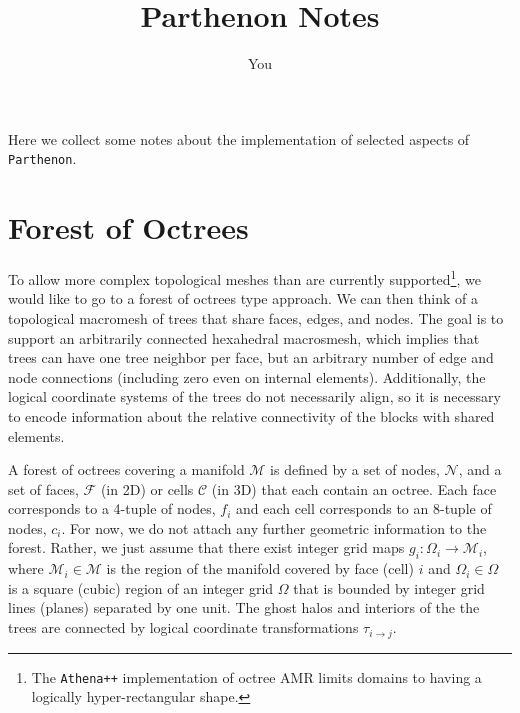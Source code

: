 \documentclass{article}
\title{Parthenon Notes}
\author{You}
\begin{document}
\maketitle

Here we collect some notes about the implementation of selected aspects of \texttt{Parthenon}.
\tableofcontents 

\section{Forest of Octrees} 

To allow more complex topological meshes than are currently supported\footnote{The \texttt{Athena++} implementation  of octree AMR limits domains to having a logically hyper-rectangular shape.}, we would like to go to a forest of octrees type approach. We can then think of a topological macromesh of trees that share faces, edges, and nodes. The goal is to support an arbitrarily connected hexahedral macrosmesh, which implies that trees can have one tree neighbor per face, but an arbitrary number of edge and node connections (including zero even on internal elements). Additionally, the logical coordinate systems of the trees do not necessarily align, so it is necessary to encode information about the relative connectivity of the blocks with shared elements. 

A forest of octrees covering a manifold $\mathcal{M}$ is defined by a set of nodes, $\mathcal{N}$, and a set of faces, $\mathcal{F}$ (in 2D) or cells $\mathcal{C}$ (in 3D) that each contain an octree. Each face corresponds to a 4-tuple of nodes, $f_i$ and each cell corresponds to an 8-tuple of nodes, $c_i$. For now, we do not attach any further geometric information to the forest. Rather, we just assume that there exist integer grid maps $g_i: \Omega_i \rightarrow \mathcal{M}_i$, where $\mathcal{M}_i \in \mathcal{M}$ is the region of the manifold covered by face (cell) $i$ and $\Omega_i \in \Omega$ is a square (cubic) region of an integer grid $\Omega$ that is bounded by integer grid lines (planes) separated by one unit. The ghost halos and interiors of the the trees are connected by logical coordinate transformations $\tau_{i \rightarrow j}$.
\begin{center}

\end{center}
\end{document}
